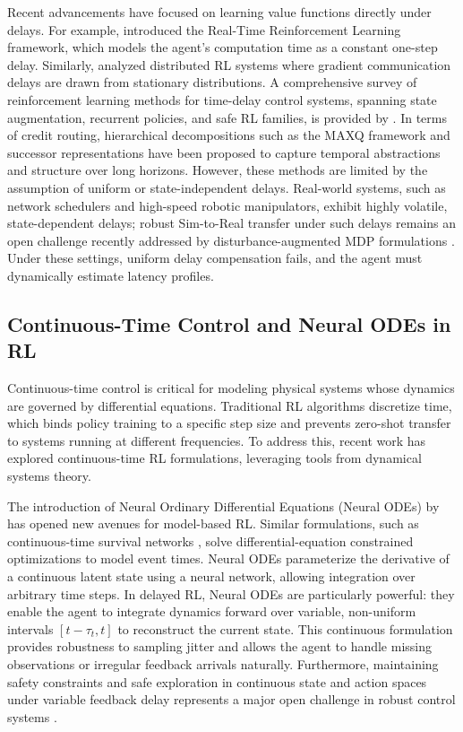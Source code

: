 \documentclass[manuscript, screen, review]{jair}
\begin{document}
Recent advancements have focused on learning value functions directly under delays. For example, \citet{ramstedt2019realtime} introduced the Real-Time Reinforcement Learning framework, which models the agent's computation time as a constant one-step delay. Similarly, \citet{barth2018distributed} analyzed distributed RL systems where gradient communication delays are drawn from stationary distributions. A comprehensive survey of reinforcement learning methods for time-delay control systems, spanning state augmentation, recurrent policies, and safe RL families, is provided by \citet{alves2026survey}. In terms of credit routing, hierarchical decompositions such as the MAXQ framework \citep{dietterich2000hierarchical} and successor representations \citep{machado2023temporal} have been proposed to capture temporal abstractions and structure over long horizons. However, these methods are limited by the assumption of uniform or state-independent delays. Real-world systems, such as network schedulers and high-speed robotic manipulators, exhibit highly volatile, state-dependent delays; robust Sim-to-Real transfer under such delays remains an open challenge recently addressed by disturbance-augmented MDP formulations \citep{malmir2025diarl}. Under these settings, uniform delay compensation fails, and the agent must dynamically estimate latency profiles.

\subsection{Continuous-Time Control and Neural ODEs in RL}
Continuous-time control is critical for modeling physical systems whose dynamics are governed by differential equations. Traditional RL algorithms discretize time, which binds policy training to a specific step size and prevents zero-shot transfer to systems running at different frequencies. To address this, recent work has explored continuous-time RL formulations, leveraging tools from dynamical systems theory.

The introduction of Neural Ordinary Differential Equations (Neural ODEs) by \citet{chen2018neuralode} has opened new avenues for model-based RL. Similar formulations, such as continuous-time survival networks \citep{tang2022soden}, solve differential-equation constrained optimizations to model event times. Neural ODEs parameterize the derivative of a continuous latent state using a neural network, allowing integration over arbitrary time steps. In delayed RL, Neural ODEs are particularly powerful: they enable the agent to integrate dynamics forward over variable, non-uniform intervals $[t-\tau_t, t]$ to reconstruct the current state. This continuous formulation provides robustness to sampling jitter and allows the agent to handle missing observations or irregular feedback arrivals naturally. Furthermore, maintaining safety constraints and safe exploration in continuous state and action spaces under variable feedback delay represents a major open challenge in robust control systems \citep{garcia2012safe}.
\end{document}
